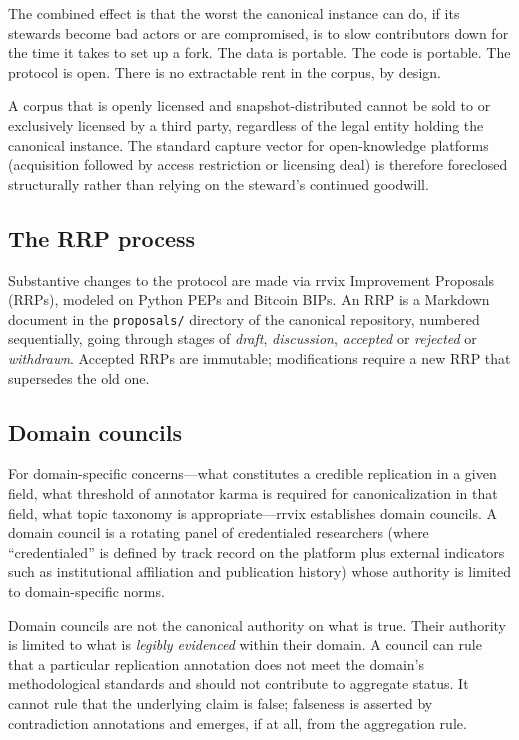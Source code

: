 \documentclass[11pt]{rrvix}
\begin{document}
The combined effect is that the worst the canonical instance can do, if its stewards become bad actors or are compromised, is to slow contributors down for the time it takes to set up a fork. The data is portable. The code is portable. The protocol is open. There is no extractable rent in the corpus, by design.

\begin{claim}
\label{claim:unsellability}
A corpus that is openly licensed and snapshot-distributed cannot be sold to or exclusively licensed by a third party, regardless of the legal entity holding the canonical instance. The standard capture vector for open-knowledge platforms (acquisition followed by access restriction or licensing deal) is therefore foreclosed structurally rather than relying on the steward's continued goodwill.
\end{claim}

\subsection{The RRP process}

Substantive changes to the protocol are made via rrvix Improvement Proposals (RRPs), modeled on Python PEPs and Bitcoin BIPs. An RRP is a Markdown document in the \texttt{proposals/} directory of the canonical repository, numbered sequentially, going through stages of \emph{draft}, \emph{discussion}, \emph{accepted} or \emph{rejected} or \emph{withdrawn}. Accepted RRPs are immutable; modifications require a new RRP that supersedes the old one.

\subsection{Domain councils}

For domain-specific concerns---what constitutes a credible replication in a given field, what threshold of annotator karma is required for canonicalization in that field, what topic taxonomy is appropriate---rrvix establishes domain councils. A domain council is a rotating panel of credentialed researchers (where ``credentialed'' is defined by track record on the platform plus external indicators such as institutional affiliation and publication history) whose authority is limited to domain-specific norms.

Domain councils are not the canonical authority on what is true. Their authority is limited to what is \emph{legibly evidenced} within their domain. A council can rule that a particular replication annotation does not meet the domain's methodological standards and should not contribute to aggregate status. It cannot rule that the underlying claim is false; falseness is asserted by contradiction annotations and emerges, if at all, from the aggregation rule.
\end{document}
